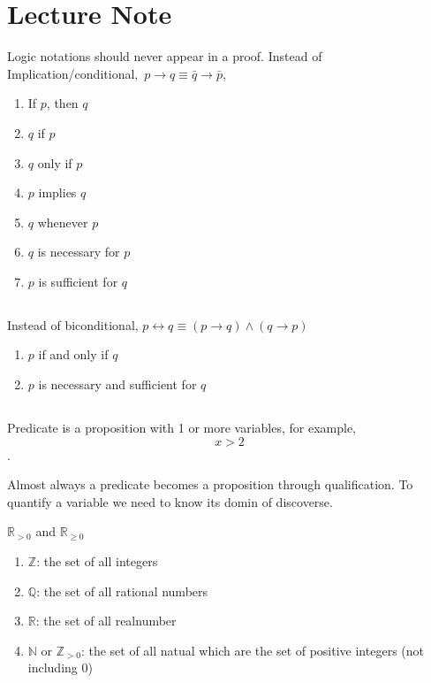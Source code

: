 \section*{Lecture Note}
Logic notations should never appear in a proof. Instead of Implication/conditional, $\,p \rightarrow q \equiv \bar{q} \to \bar{p}$,
\begin{enumerate}
    \item If $p$, then $q$
    \item $q$ if $p$
    \item $q$ only if $p$
    \item $p$ implies $q$
    \item $q$ whenever $p$
    \item $q$ is necessary for $p$
    \item $p$ is sufficient for $q$
\end{enumerate}


\subsection{ }
Instead of biconditional, $p \leftrightarrow q \equiv \left(p \to q\right) \wedge \left(q \to p\right)$
\begin{enumerate}
    \item $p$ if and only if $q$
    \item $p$ is necessary and sufficient for $q$
\end{enumerate}



\subsection{ }
Predicate is a proposition with 1 or more variables, for example, $$x>2$$.

Almost always a predicate becomes a proposition through qualification. 
To quantify a variable we need to know its domin of discoverse.

$\mathbb{R}_{>0}$ and $\mathbb{R}_{\geq 0}$

\begin{enumerate}
    \item $\mathbb{Z}$: the set of all integers
    \item $\mathbb{Q}$: the set of all rational numbers
    \item $\mathbb{R}$: the set of all realnumber
    \item $\mathbb{N}$ or $\mathbb{Z}_{>0}$: the set of all natual  which are the set of positive integers (not including $0$)
\end{enumerate}


